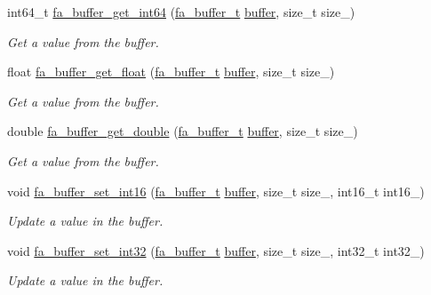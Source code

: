 \begin{DoxyCompactItemize}
int64\-\_\-t \hyperlink{group___fa_buffer_gad596c5b40ca8ce644eff53140aa3d8c9}{fa\-\_\-buffer\-\_\-get\-\_\-int64} (\hyperlink{group___fa_buffer_ga0ed7a1d783ab322e2e8be02432d0839e}{fa\-\_\-buffer\-\_\-t} \hyperlink{util_8h_ad0c623e8b04565926f5b48888327724a}{buffer}, size\-\_\-t size\-\_\-)
\begin{DoxyCompactList}\small\item\em Get a value from the buffer. \end{DoxyCompactList}\item 
float \hyperlink{group___fa_buffer_gaf317e894970857eee2b1e315e6b341ee}{fa\-\_\-buffer\-\_\-get\-\_\-float} (\hyperlink{group___fa_buffer_ga0ed7a1d783ab322e2e8be02432d0839e}{fa\-\_\-buffer\-\_\-t} \hyperlink{util_8h_ad0c623e8b04565926f5b48888327724a}{buffer}, size\-\_\-t size\-\_\-)
\begin{DoxyCompactList}\small\item\em Get a value from the buffer. \end{DoxyCompactList}\item 
double \hyperlink{group___fa_buffer_gae6416e46d9dc795feb4dad5a45b381b5}{fa\-\_\-buffer\-\_\-get\-\_\-double} (\hyperlink{group___fa_buffer_ga0ed7a1d783ab322e2e8be02432d0839e}{fa\-\_\-buffer\-\_\-t} \hyperlink{util_8h_ad0c623e8b04565926f5b48888327724a}{buffer}, size\-\_\-t size\-\_\-)
\begin{DoxyCompactList}\small\item\em Get a value from the buffer. \end{DoxyCompactList}\item 
void \hyperlink{group___fa_buffer_gaddf42d41a14338e04f83f854dc264f2d}{fa\-\_\-buffer\-\_\-set\-\_\-int16} (\hyperlink{group___fa_buffer_ga0ed7a1d783ab322e2e8be02432d0839e}{fa\-\_\-buffer\-\_\-t} \hyperlink{util_8h_ad0c623e8b04565926f5b48888327724a}{buffer}, size\-\_\-t size\-\_\-, int16\-\_\-t int16\-\_\-)
\begin{DoxyCompactList}\small\item\em Update a value in the buffer. \end{DoxyCompactList}\item 
void \hyperlink{group___fa_buffer_gaa29344ea6962a2e728ba96e3837b7608}{fa\-\_\-buffer\-\_\-set\-\_\-int32} (\hyperlink{group___fa_buffer_ga0ed7a1d783ab322e2e8be02432d0839e}{fa\-\_\-buffer\-\_\-t} \hyperlink{util_8h_ad0c623e8b04565926f5b48888327724a}{buffer}, size\-\_\-t size\-\_\-, int32\-\_\-t int32\-\_\-)
\begin{DoxyCompactList}\small\item\em Update a value in the buffer. \end{DoxyCompactList}\item 

\end{DoxyCompactItemize}

